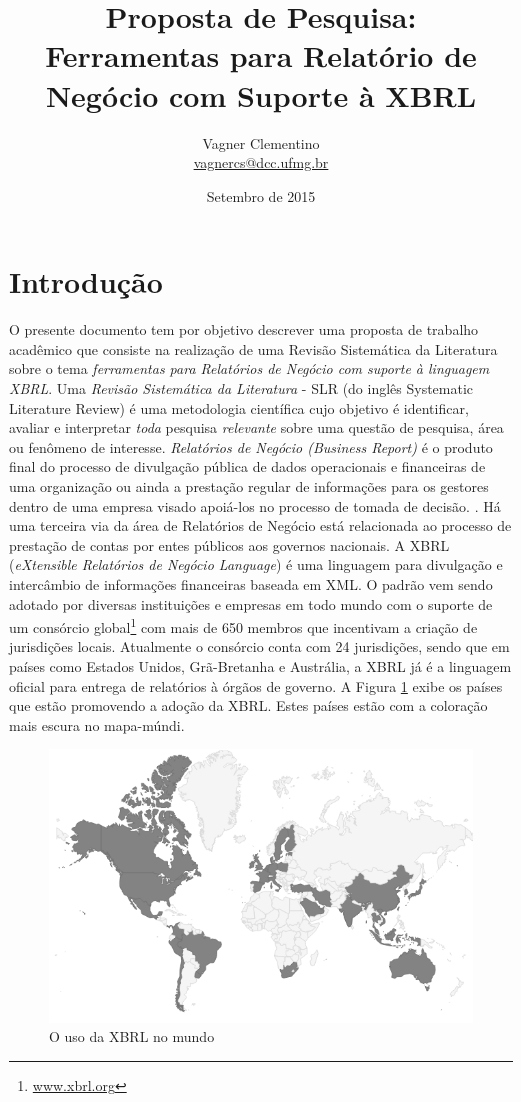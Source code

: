 \documentclass{article}
\title{Proposta de Pesquisa: \\
Ferramentas para Relatório de Negócio com Suporte à XBRL
}
\author{Vagner Clementino \\ 
       \url{vagnercs@dcc.ufmg.br}}
\date{Setembro de  2015}
\begin{document}
\maketitle

\section{Introdução}
\label{sec:intro}

O presente documento tem por objetivo descrever uma proposta de
trabalho acadêmico que  consiste na realização de uma Revisão Sistemática da
Literatura sobre o tema \textit{ferramentas para Relatórios de Negócio com suporte à linguagem XBRL}. Uma \textit{Revisão Sistemática da Literatura} - SLR (do inglês Systematic Literature Review) é uma
metodologia científica cujo objetivo é identificar, avaliar e interpretar
\textit{toda} pesquisa \textit{relevante} sobre uma questão de
pesquisa, área ou fenômeno de
interesse\cite{keele2007guidelines,wohlin2012experimentation}. \textit{Relatórios
  de Negócio (Business Report)} é o produto final do  processo de divulgação
pública de dados operacionais e financeiras de uma organização ou
ainda a prestação regular de informações para os gestores dentro
de uma empresa visado apoiá-los no processo de tomada de decisão.
\cite{lymer1999business}. Há uma terceira via da área de  Relatórios de Negócio
está relacionada ao processo de prestação de contas por entes públicos aos
governos nacionais. A XBRL (\textit{eXtensible Relatórios de Negócio
  Language}) é uma linguagem para divulgação e intercâmbio de
informações financeiras baseada em
XML\cite{xbrl_conceitos_aplicacoes}. O padrão vem sendo adotado por
diversas instituições e empresas em todo mundo com o suporte de um
consórcio global\footnote{\url{www.xbrl.org}} com mais de 650 membros
que incentivam a criação de jurisdições locais. Atualmente o consórcio
conta com 24 jurisdições, sendo que em países como  Estados Unidos,
Grã-Bretanha e Austrália, a XBRL já é a linguagem oficial para entrega
de relatórios à órgãos de governo. A Figura \ref{fig:world_map} exibe
os países que estão promovendo a adoção da XBRL. Estes países estão
com a coloração mais escura no mapa-múndi.

\begin{figure}[htb]
\centering
\includegraphics[width=.75\textwidth]{../img/world-map.png}
\caption{O uso da XBRL no mundo}
\label{fig:world_map}
\end{figure}
\end{document}
